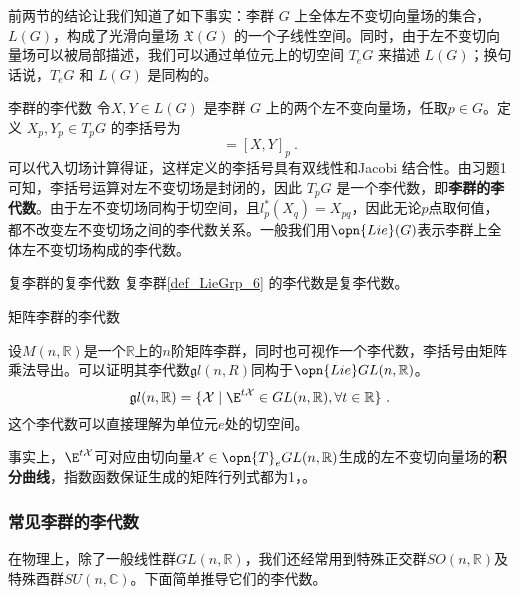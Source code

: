 前两节的结论让我们知道了如下事实：李群 $G$ 上全体左不变切向量场的集合，$L(G)$，构成了光滑向量场 $\mathfrak{X}(G)$ 的一个子线性空间。同时，由于左不变切向量场可以被局部描述，我们可以通过单位元上的切空间 $T_eG$ 来描述 $L(G)$；换句话说，$T_eG$ 和 $L(G)$ 是同构的。

\begin{definition}{李群的李代数}
令$X, Y\in L(G)$ 是李群 $G$ 上的两个左不变向量场，任取$p\in G$。定义 $X_p, Y_p\in T_pG$ 的李括号为
\begin{equation}
[X_p, Y_p]=[X, Y]_p~.
\end{equation}
可以代入切场计算得证，这样定义的李括号具有双线性和Jacobi 结合性。由习题1可知，李括号运算对左不变切场是封闭的，因此 $T_p G$ 是一个李代数，即\textbf{李群的李代数}。由于左不变切场同构于切空间，且$l_p^*(X_q)=X_{pq}$，因此无论$p$点取何值，都不改变左不变切场之间的李代数关系。一般我们用$\opn{Lie}(G)$表示李群上全体左不变切场构成的李代数。
\end{definition}




\begin{theorem}{复李群的复李代数}
复李群\autoref{def_LieGrp_6} 的李代数是复李代数。
\end{theorem}



\begin{example}{矩阵李群的李代数}

设$M(n,\mathbb R)$是一个$\mathbb{R}$上的$n$阶矩阵李群，同时也可视作一个李代数，李括号由矩阵乘法导出。可以证明其李代数$\mathfrak gl(n,R)$同构于$\opn{Lie}GL(n,\mathbb R)$。
\begin{equation}\label{eq_LieGA_3}
\mathfrak gl(n,\mathbb R) = \{ \mathcal{X} \mid \E^{t\mathcal{X}}\in GL(n,\mathbb R), \forall t\in\mathbb{R} \}~.
\end{equation}
这个李代数可以直接理解为单位元$e$处的切空间。

事实上，$\E^{t\mathcal{X}}$可对应由切向量$\mathcal{X}\in\opn{T}_e GL(n,\mathbb R)$生成的左不变切向量场的\textbf{积分曲线}，指数函数保证生成的矩阵行列式都为1，。

\end{example}
\subsubsection{常见李群的李代数}
在物理上，除了一般线性群$GL(n,\mathbb R)$，我们还经常用到特殊正交群$SO(n,\mathbb R)$及特殊酉群$SU(n,\mathbb C)$。下面简单推导它们的李代数。

